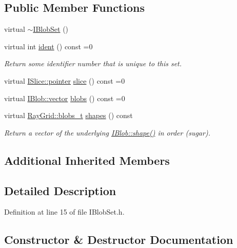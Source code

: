 \subsection*{Public Member Functions}
\begin{DoxyCompactItemize}
\item 
virtual \hyperlink{class_wire_cell_1_1_i_blob_set_a8bacb591cc8153bb98a84794c94fcf1a}{$\sim$\+I\+Blob\+Set} ()
\item 
virtual int \hyperlink{class_wire_cell_1_1_i_blob_set_a18567545bde587af9d775efd55bf39fa}{ident} () const =0
\begin{DoxyCompactList}\small\item\em Return some identifier number that is unique to this set. \end{DoxyCompactList}\item 
virtual \hyperlink{class_wire_cell_1_1_i_data_aff870b3ae8333cf9265941eef62498bc}{I\+Slice\+::pointer} \hyperlink{class_wire_cell_1_1_i_blob_set_ac3fae97101f3ab70f6833296e43817a3}{slice} () const =0
\item 
virtual \hyperlink{class_wire_cell_1_1_i_data_ae1a9f863380499bb43f39fabb6276660}{I\+Blob\+::vector} \hyperlink{class_wire_cell_1_1_i_blob_set_af9c19bbf4c1241ddaa3b2022129a766a}{blobs} () const =0
\item 
virtual \hyperlink{namespace_wire_cell_1_1_ray_grid_aea2069aff62790df3241ee7446e81ade}{Ray\+Grid\+::blobs\+\_\+t} \hyperlink{class_wire_cell_1_1_i_blob_set_abf09ebcd27b5dea4b7608ec7fd5abbc0}{shapes} () const
\begin{DoxyCompactList}\small\item\em Return a vector of the underlying \hyperlink{class_wire_cell_1_1_i_blob_a241a18f7f178a2021c643ffb6eed6e3f}{I\+Blob\+::shape()} in order (sugar). \end{DoxyCompactList}\end{DoxyCompactItemize}
\subsection*{Additional Inherited Members}


\subsection{Detailed Description}


Definition at line 15 of file I\+Blob\+Set.\+h.



\subsection{Constructor \& Destructor Documentation}
\mbox{\label{class_wire_cell_1_1_i_blob_set_a8bacb591cc8153bb98a84794c94fcf1a}} 
